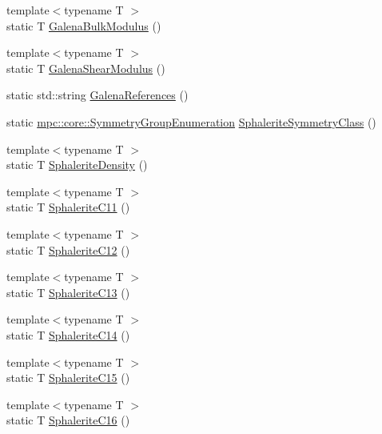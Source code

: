 \begin{DoxyCompactItemize}
\item 
{\footnotesize template$<$typename T $>$ }\\static T \mbox{\hyperlink{namespacempc_1_1data_a004f7f9686344460dada6c42a441b761}{Galena\+Bulk\+Modulus}} ()
\item 
{\footnotesize template$<$typename T $>$ }\\static T \mbox{\hyperlink{namespacempc_1_1data_a6f0e6fec4c5eed084981f6c1359e26e1}{Galena\+Shear\+Modulus}} ()
\item 
static std\+::string \mbox{\hyperlink{namespacempc_1_1data_ad0c1ba815c7fde05c0efbe049ba5d1dc}{Galena\+References}} ()
\item 
static \mbox{\hyperlink{namespacempc_1_1core_a9d979684062547055a0ef5c13077bad8}{mpc\+::core\+::\+Symmetry\+Group\+Enumeration}} \mbox{\hyperlink{namespacempc_1_1data_a86fd71c8bff0ae24e586415d47116c47}{Sphalerite\+Symmetry\+Class}} ()
\item 
{\footnotesize template$<$typename T $>$ }\\static T \mbox{\hyperlink{namespacempc_1_1data_a1549b2386c42d4873d68823cdc9772f6}{Sphalerite\+Density}} ()
\item 
{\footnotesize template$<$typename T $>$ }\\static T \mbox{\hyperlink{namespacempc_1_1data_a225171780fdfe5996111a1caa9ddce8d}{Sphalerite\+C11}} ()
\item 
{\footnotesize template$<$typename T $>$ }\\static T \mbox{\hyperlink{namespacempc_1_1data_a151af0de9d727bfb6117522da41cb437}{Sphalerite\+C12}} ()
\item 
{\footnotesize template$<$typename T $>$ }\\static T \mbox{\hyperlink{namespacempc_1_1data_a4e55f6264c75003a06e51a0c982761c9}{Sphalerite\+C13}} ()
\item 
{\footnotesize template$<$typename T $>$ }\\static T \mbox{\hyperlink{namespacempc_1_1data_aa3e9047ee58a5ac8da124fa64921d5d2}{Sphalerite\+C14}} ()
\item 
{\footnotesize template$<$typename T $>$ }\\static T \mbox{\hyperlink{namespacempc_1_1data_a3f11bacdc71fcfb3f5c8f040aecde0dc}{Sphalerite\+C15}} ()
\item 
{\footnotesize template$<$typename T $>$ }\\static T \mbox{\hyperlink{namespacempc_1_1data_acd828d9844c72354b181e3874ed3978f}{Sphalerite\+C16}} ()
\item 

\end{DoxyCompactItemize}
